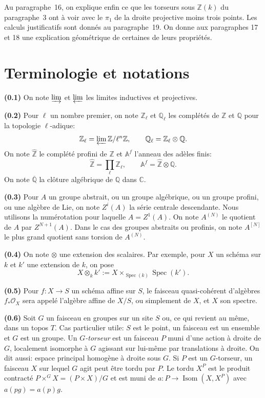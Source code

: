 \documentclass[12pt,a4paper]{article}
\theoremstyle{plain}
\theoremstyle{definition}
\theoremstyle{remark}
\DeclareMathOperator{\Spec}{Spec}
\DeclareMathOperator{\Isom}{Isom}
\providecommand{\Spec}{\operatorname{Spec}}
\providecommand{\limind}{\varinjlim}
\providecommand{\limproj}{\varprojlim}
\begin{document}
Au paragraphe~16, on explique enfin ce que les torseurs sous $\mathbb{Z}(k)$ du
paragraphe~3 ont \`a voir avec le $\pi_1$ de la droite projective moins trois points. Les
calculs justificatifs sont donn\'es au paragraphe~19. On donne aux paragraphes 17 et 18
une explication g\'eom\'etrique de certaines de leurs propri\'et\'es.

\section{Terminologie et notations}\label{sec:0}

\textbf{(0.1)} On note $\limind$ et $\limproj$ les limites inductives et projectives.

\textbf{(0.2)} Pour $\ell$ un nombre premier, on note $\mathbb{Z}_\ell$ et $\mathbb{Q}_\ell$
les compl\'et\'es de $\mathbb{Z}$ et $\mathbb{Q}$ pour la topologie $\ell$-adique:
\[
\mathbb{Z}_\ell = \limproj \mathbb{Z}/\ell^n\mathbb{Z}, \qquad
\mathbb{Q}_\ell = \mathbb{Z}_\ell \otimes \mathbb{Q}.
\]
On note $\hat{\mathbb{Z}}$ le compl\'et\'e profini de $\mathbb{Z}$ et $\mathbb{A}^f$
l'anneau des ad\`eles finis:
\[
\hat{\mathbb{Z}} = \prod_\ell \mathbb{Z}_\ell, \qquad
\mathbb{A}^f = \hat{\mathbb{Z}} \otimes \mathbb{Q}.
\]
On note $\overline{\mathbb{Q}}$ la cl\^oture alg\'ebrique de $\mathbb{Q}$ dans $\mathbb{C}$.

\textbf{(0.3)} Pour $A$ un groupe abstrait, ou un groupe alg\'ebrique, ou un groupe
profini, ou une alg\`ebre de Lie, on note $Z^i(A)$ la s\'erie centrale descendante.
Nous utilisons la num\'erotation pour laquelle $A = Z^1(A)$. On note $A^{(N)}$ le
quotient de $A$ par $Z^{N+1}(A)$. Dans le cas des groupes abstraits ou profinis, on note
$A^{[N]}$ le plus grand quotient sans torsion de $A^{(N)}$.

\textbf{(0.4)} On note $\otimes$ une extension des scalaires. Par exemple, pour $X$ un
sch\'ema sur $k$ et $k'$ une extension de $k$, on pose
\[
X \otimes_k k' := X \times_{\Spec(k)} \Spec(k').
\]

\textbf{(0.5)} Pour $f: X \to S$ un sch\'ema affine sur $S$, le faisceau quasi-coh\'erent
d'alg\`ebres $f_* \mathcal{O}_X$ sera appel\'e l'alg\`ebre affine de $X/S$, ou simplement de
$X$, et $X$ son spectre.

\textbf{(0.6)} Soit $G$ un faisceau en groupes sur un site $S$ ou, ce qui revient au
m\^eme, dans un topos $T$. Cas particulier utile: $S$ est le point, un faisceau est un
ensemble et $G$ est un groupe. Un \emph{$G$-torseur} est un faisceau $P$ muni d'une
action \`a droite de $G$, localement isomorphe \`a $G$ agissant sur lui-m\^eme par
translations \`a droite. On dit aussi: espace principal homog\`ene \`a droite sous $G$.
Si $P$ est un $G$-torseur, un faisceau $X$ sur lequel $G$ agit peut \^etre tordu par $P$.
Le tordu $X^P$ est le produit contract\'e $P \times^G X = (P \times X)/G$ et est muni de
$a: P \to \Isom(X, X^P)$ avec $a(pg) = a(p)g$.
\end{document}
